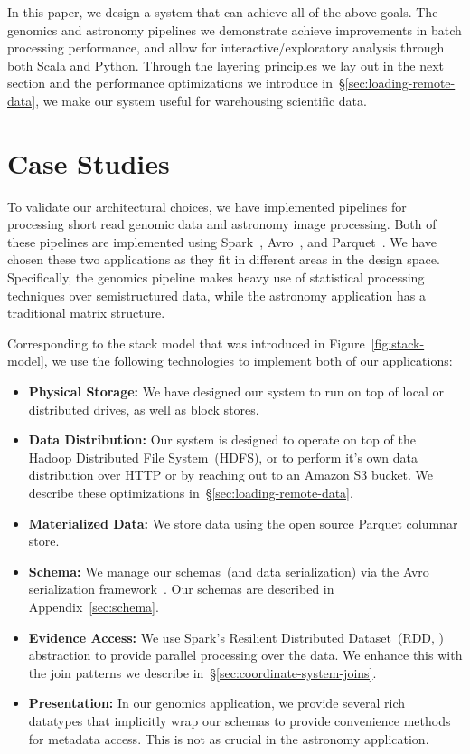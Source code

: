 \documentclass{acm_proc_article-sp}
\begin{document}
In this paper, we design a system that can achieve all of the above goals. The genomics and
astronomy pipelines we demonstrate achieve improvements in batch processing performance, and
allow for interactive/exploratory analysis through both Scala and Python. Through the layering principles
we lay out in the next section and the performance optimizations we introduce
in~\S\ref{sec:loading-remote-data}, we make our system useful for warehousing scientific data.

\section{Case Studies}
\label{sec:case-studies}

To validate our architectural choices, we have implemented pipelines for processing short read genomic
data and astronomy image processing. Both of these pipelines are implemented using
Spark~\cite{zaharia10}, Avro~\cite{avro}, and Parquet~\cite{parquet}. We have chosen these two
applications as they fit in different areas in the design space. Specifically, the genomics pipeline makes
heavy use of statistical processing techniques over semistructured data, while the astronomy application
has a traditional matrix structure.

Corresponding to the stack model that was introduced in Figure~\ref{fig:stack-model}, we use the
following technologies to implement both of our applications:

\begin{itemize}
\item \textbf{Physical Storage:} We have designed our system to run on top of local or distributed
drives, as well as block stores.
\item \textbf{Data Distribution:} Our system is designed to operate on top of the Hadoop Distributed File \linebreak
System~(HDFS), or to perform it's own data distribution over HTTP or by reaching out to an Amazon
S3 bucket. We describe these optimizations in~\S\ref{sec:loading-remote-data}.
\item \textbf{Materialized Data:} We store data using the open source Parquet columnar store.
\item \textbf{Schema:} We manage our schemas~(and data serialization) via the Avro serialization
framework~\cite{avro}. Our schemas are described in Appendix~\ref{sec:schema}.
\item \textbf{Evidence Access:} We use Spark's Resilient \linebreak Distributed Dataset~(RDD, \cite{zaharia12})
abstraction to provide parallel processing over the data. We enhance this with the join patterns we
describe in~\S\ref{sec:coordinate-system-joins}.
\item \textbf{Presentation:} In our genomics application, we provide several rich datatypes that implicitly
wrap our schemas to provide convenience methods for metadata access. This is not as crucial in the
astronomy application.
\end{itemize}
\end{document}
